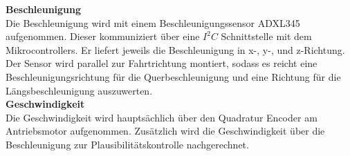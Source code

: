\documentclass[../../main.tex]{subfiles}
\begin{document}
    \textbf{Beschleunigung}\\
    Die Beschleunigung wird mit einem Beschleunigungssensor ADXL345 aufgenommen. Dieser kommuniziert über eine $I^2C$ Schnittstelle mit dem Mikrocontrollers. Er liefert jeweils die Beschleunigung in x-, y-, und z-Richtung. Der Sensor wird parallel zur Fahrtrichtung montiert, sodass es reicht eine Beschleunigungsrichtung für die Querbeschleunigung und eine Richtung für die Längsbeschleunigung auszuwerten.\\

    \textbf{Geschwindigkeit}\\ \label{et_geschwindigkeit}
    Die Geschwindigkeit wird hauptsächlich über den Quadratur Encoder am Antriebsmotor aufgenommen. Zusätzlich wird die Geschwindigkeit über die Beschleunigung zur Plausibilitätskontrolle nachgerechnet.
\end{document}
